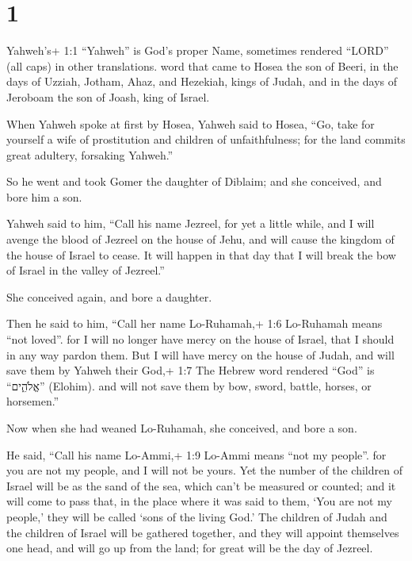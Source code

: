 \hypertarget{section}{%
\section{1}\label{section}}

 Yahweh's+ 1:1 ``Yahweh'' is God's proper Name, sometimes
rendered ``LORD'' (all caps) in other translations. word that came to
Hosea the son of Beeri, in the days of Uzziah, Jotham, Ahaz, and
Hezekiah, kings of Judah, and in the days of Jeroboam the son of Joash,
king of Israel.

 When Yahweh spoke at first by Hosea, Yahweh said to Hosea,
``Go, take for yourself a wife of prostitution and children of
unfaithfulness; for the land commits great adultery, forsaking Yahweh.''

 So he went and took Gomer the daughter of Diblaim; and she
conceived, and bore him a son.

 Yahweh said to him, ``Call his name Jezreel, for yet a
little while, and I will avenge the blood of Jezreel on the house of
Jehu, and will cause the kingdom of the house of Israel to cease.
 It will happen in that day that I will break the bow of
Israel in the valley of Jezreel.''

 She conceived again, and bore a daughter.

Then he said to him, ``Call her name Lo-Ruhamah,+ 1:6 Lo-Ruhamah means
``not loved''. for I will no longer have mercy on the house of Israel,
that I should in any way pardon them.  But I will have mercy
on the house of Judah, and will save them by Yahweh their God,+ 1:7 The
Hebrew word rendered ``God'' is ``אֱלֹהִ֑ים'' (Elohim). and will not
save them by bow, sword, battle, horses, or horsemen.''

 Now when she had weaned Lo-Ruhamah, she conceived, and bore
a son.

 He said, ``Call his name Lo-Ammi,+ 1:9 Lo-Ammi means ``not
my people''. for you are not my people, and I will not be yours.
 Yet the number of the children of Israel will be as the
sand of the sea, which can't be measured or counted; and it will come to
pass that, in the place where it was said to them, `You are not my
people,' they will be called `sons of the living God.'  The
children of Judah and the children of Israel will be gathered together,
and they will appoint themselves one head, and will go up from the land;
for great will be the day of Jezreel.


